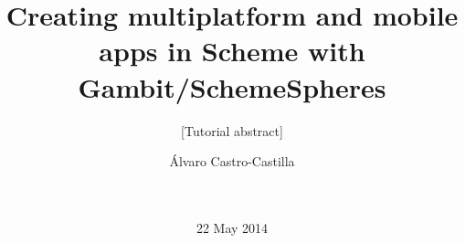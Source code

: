 \documentclass{acm_proc_article-sp}
\begin{document}
\title{Creating multiplatform and mobile apps in Scheme with Gambit/SchemeSpheres}
\subtitle{[Tutorial abstract]}
%
%
%
%
%

%
\author{
%
%
\alignauthor
Álvaro Castro-Castilla\\
       \\
       \\
}
\date{22 May 2014}
\end{document}

